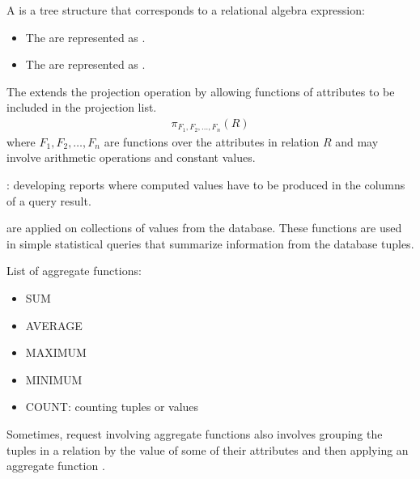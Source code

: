     \par A  is a tree structure that corresponds to a relational algebra expression:
    \begin{itemize}
      \item The  are represented as .
      \item The  are represented as .
    \end{itemize}


    \par The  extends the projection operation by allowing
functions of attributes to be included in the projection list.
    \begin{align*}
      \pi_{F_1, F_2, \ldots, F_n}(R)
    \end{align*}
    where $F_1, F_2, \ldots, F_n$ are functions over the attributes in relation $R$ and may involve arithmetic operations and constant values.
    \par {}: developing reports where computed values have to be produced in the columns of a query result.

      \par {} are applied on collections of values from the database. These functions are used in simple statistical queries that summarize information from the database tuples.
      \par List of aggregate functions:
        \begin{itemize}
          \item SUM
          \item AVERAGE
          \item MAXIMUM
          \item MINIMUM
          \item COUNT: counting tuples or values
        \end{itemize}


      \par Sometimes, request involving aggregate functions also involves grouping the tuples in a relation by the value of some of their attributes and then applying an aggregate function .

